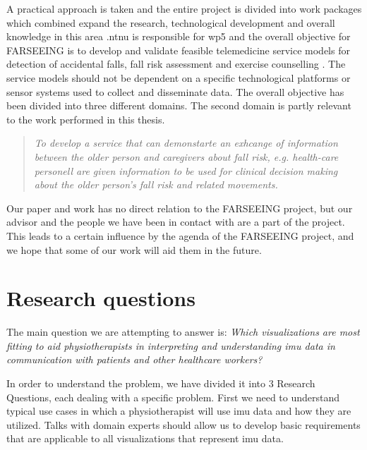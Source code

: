 A practical approach is taken and the entire project is divided into work packages which combined expand the research, technological development and overall knowledge in this area \cite{farseeing}.\gls{ntnu} is responsible for \gls{wp5} and the overall objective for FARSEEING is to develop and validate feasible telemedicine service models for detection of accidental falls, fall risk assessment and exercise counselling \cite{wp5}. The service models should not be dependent on a specific technological platforms or sensor systems used to collect and disseminate data. The overall objective has been divided into three different domains. The second domain is partly relevant to the work performed in this thesis.
\begin{quote}
\textit{To develop a service that can demonstarte an exhcange of information between the older person and caregivers about fall risk, e.g. health-care personell are given information to be used for clinical decision making about the older person's fall risk and related movements.}
\end{quote}
Our paper and work has no direct relation to the FARSEEING project, but our advisor and the people we have been in contact with are a part of the project. This leads to a certain influence by the agenda of the FARSEEING project, and we hope that some of our work will aid them in the future.

\section{Research questions}
The main question we are attempting to answer is: \textit{Which visualizations are most fitting to aid physiotherapists in interpreting and understanding \gls{imu} data in communication with patients and other healthcare workers?}

In order to understand the problem, we have divided it into 3 Research Questions, each dealing with a specific problem. First we need to understand typical use cases in which a physiotherapist will use \gls{imu} data and how they are utilized. Talks with domain experts should allow us to develop basic requirements that are applicable to all visualizations that represent \gls{imu} data.

